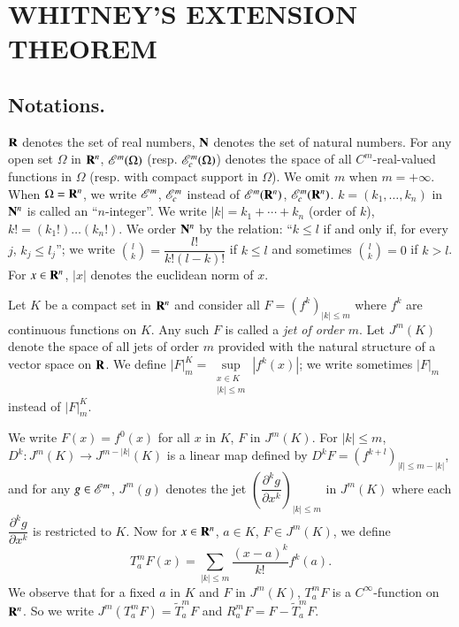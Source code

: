 \chapter{WHITNEY'S EXTENSION THEOREM}\label{chap1}

\section{Notations.}\label{chap1-sec1}

$\mathbf{R}$ denotes the set of real numbers, $\mathbf{N}$ denotes the set of natural numbers. For any open set $\Omega$ in $\mathbf{R}^{n}$, $\mathscr{E}^{m}(\Omega)$ (resp. $\mathscr{E}^{m}_{c}(\Omega)$) denotes the space of all $C^{m}$-real-valued functions in $\Omega$ (resp. with compact support in $\Omega$). We omit $m$ when $m=+\infty$. When $\Omega=\mathbf{R}^{n}$, we write $\mathscr{E}^{m}$, $\mathscr{E}^{m}_{c}$ instead of $\mathscr{E}^{m}(\mathbf{R}^{n})$, $\mathscr{E}^{m}_{c}(\mathbf{R}^{n})$. $k=(k_{1},\ldots,k_{n})$ in $\mathbf{N}^{n}$ is called an ``$n$-integer''. We write $|k|=k_{1}+\cdots+k_{n}$ (order of $k$), $k!=(k_{1}!)\ldots(k_{n}!)$. We order $\mathbf{N}^{n}$ by the relation: ``$k\leq l$ if and only if, for every $j$, $k_{j}\leq l_{j}$''; we write $\binom{l}{k}=\dfrac{l!}{k!(l-k)!}$ if $k\leq l$ and sometimes $\binom{l}{k}=0$ if $k>l$. For $x\in \mathbf{R}^{n}$, $|x|$ denotes the euclidean norm of $x$.

Let $K$ be a compact set in $\mathbf{R}^{n}$ and consider all $F=(f^{k})_{|k|\leq m}$ where $f^{k}$ are continuous functions on $K$. Any such $F$ is called a {\em jet of order $m$}. Let $J^{m}(K)$ denote the space of all jets of order $m$ provided with the natural structure of a vector space on $\mathbf{R}$. We define $|F|^{K}_{m}=\sup\limits_{\substack{x\in K\\ |k|\leq m}}|f^{k}(x)|$; we write sometimes $|F|_{m}$ instead of $|F|^{K}_{m}$.

We write $F(x)=f^{0}(x)$ for all $x$ in $K$, $F$ in $J^{m}(K)$. For $|k|\leq m$, $D^{k}:J^{m}(K)\to J^{m-|k|}(K)$ is a linear map defined by $D^{k}F=(f^{k+l})_{|l|\leq m-|k|}$, and for any $g\in \mathscr{E}^{m}$, $J^{m}(g)$ denotes the jet $\left(\dfrac{\partial^{k}g}{\partial x^{k}}\right)_{|k|\leq m}$ in $J^{m}(K)$ where each $\dfrac{\partial^{k}g}{\partial x^{k}}$ is restricted to $K$. Now for $x\in \mathbf{R}^{n}$, $a\in K$, $F\in J^{m}(K)$, we define
$$
T^{m}_{a}F(x)=\sum\limits_{|k|\leq m}\dfrac{(x-a)^{k}}{k!}f^{k}(a).
$$
We observe that for a fixed $a$ in $K$ and $F$ in $J^{m}(K)$, $T^{m}_{a}F$ is a $C^{\infty}$-function on $\mathbf{R}^{n}$. So we write $J^{m}(T^{m}_{a}F)=\widetilde{T}^{m}_{a}F$ and $R^{m}_{a}F=F-\widetilde{T}^{m}_{a}F$.

